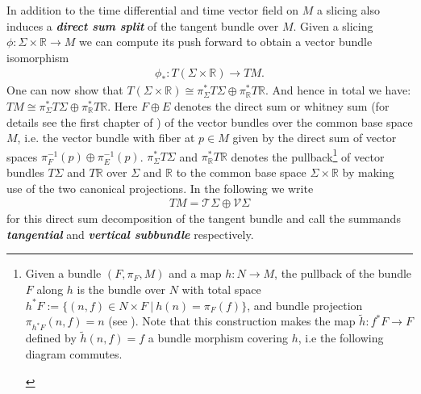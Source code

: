 \documentclass[a4paper,12pt, DIV=14, BCOR=5mm, twoside, headsepline, numbers=noenddot]{scrbook}
\begin{document}
In addition to the time differential and time vector field on $M$ a slicing also induces a \textbf{\textit{direct sum split}} of the tangent bundle over $M$. Given a slicing $\phi : \Sigma \times \mathbb{R} \rightarrow M$ we can compute its push forward to obtain a vector bundle isomorphism
\begin{align}
\phi_{\ast}: T(\Sigma \times \mathbb{R}) \longrightarrow TM.
\end{align}
One can now show that $T(\Sigma \times \mathbb{R}) \cong \pi_{\Sigma}^{\ast}T\Sigma \oplus \pi_{\mathbb{R}}^{\ast} T\mathbb{R}$. And hence in total we have: $TM \cong \pi_{\Sigma}^{\ast}T\Sigma \oplus \pi_{\mathbb{R}}^{\ast} T\mathbb{R}$.
Here $F\oplus E$ denotes the direct sum or whitney sum (for details see the first chapter of \cite{nla.cat-vn705150}) of the vector bundles over the common base space $M$, i.e. the vector bundle with fiber at $p \in M$ given by the direct sum of vector spaces $\pi_F^{-1}(p) \oplus \pi_E^{-1}(p)$. $\pi_{\Sigma}^{\ast}T\Sigma$ and $\pi_{\mathbb{R}}^{\ast}T\mathbb{R}$ denotes the pullback\footnote{Given a bundle $(F,\pi_F,M)$ and a map $h: N \rightarrow M$, the pullback of the bundle $F$ along $h$ is the bundle over $N$ with total space $h^{\ast}F := \{ (n,f) \in N \times F \ \vert \  h(n) = \pi_F(f)\}$, and bundle projection $\pi_{h^{\ast}F}(n,f) = n$ (see \cite{doi:10.1142/3867}). Note that this construction makes the map $\tilde{h}: f^{\ast}F \rightarrow F$ defined by $\tilde{h}(n,f) = f$ a bundle morphism covering $h$, i.e the following diagram commutes. 
\begin{center}
\end{center}} of vector bundles $T\Sigma$ and $T\mathbb{R}$ over $\Sigma$ and $\mathbb{R}$ to the common base space $\Sigma \times \mathbb{R}$ by making use of the two canonical projections. In the following we write
\begin{align}
    TM = \mathcal{T}\Sigma \oplus \mathcal{V}\Sigma
\end{align} 
for this direct sum decomposition of the tangent bundle and call the summands \textit{\textbf{tangential}} and \textit{\textbf{vertical subbundle}} respectively.  
\end{document}
